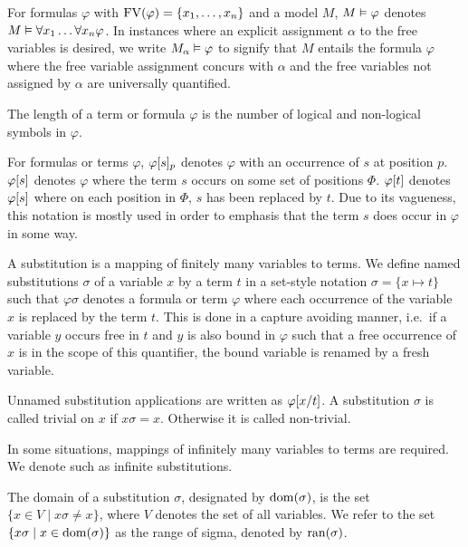 For formulas $\varphi$ with $\operatorname{FV}(\varphi) = \{x_1, \dots, x_n\}$ and a model $M$, $M\vDash \varphi$ denotes $M \vDash \forall x_1 \dots \forall x_n \varphi$.
In instances where an explicit assignment $\alpha$ to the free variables is desired,
we write $M_\alpha \vDash \varphi$ 
to signify that $M$ entails the formula $\varphi$ where the free variable assignment concurs with $\alpha$ and the free variables not assigned by $\alpha$ are universally quantified.

The length of a term or formula $\varphi$ is the number of logical and non-logical symbols in $\varphi$.

For formulas or terms $\varphi$, $\varphi{\ensuremath{[s]}_{p}}$ denotes $\varphi$ with an occurrence of $s$ at position $p$.
$\varphi[s]$ denotes $\varphi$ where the term $s$ occurs on some set of positions $\Phi$. $\varphi[t]$ denotes $\varphi[s]$ where on each position in $\Phi$, $s$ has been replaced by $t$. Due to its vagueness, this notation is mostly used in order to emphasis that the term $s$ does occur in $\varphi$ in some way.





A substitution is a mapping of finitely many variables to terms.
We define named substitutions $\sigma$ of a variable $x$ by a term $t$ in a set-style notation $\sigma = \{ x \mapsto t\}$ such that 
$\varphi\sigma$ denotes a formula or term $\varphi$ where each occurrence of the variable $x$ is replaced by the term $t$.
This is done in a capture avoiding manner, i.e.\ if a variable $y$ occurs free in $t$ and $y$ is also bound in $\varphi$ such that a free occurrence of $x$ is in the scope of this quantifier, the bound variable is renamed by a fresh variable.

Unnamed substitution applications are written as $\varphi[x/t]$.
A substitution $\sigma$ is called trivial on $x$ if $x\sigma = x$. Otherwise it is called non-trivial.

In some situations, mappings of infinitely many variables to terms are required. We denote such as infinite substitutions.

The domain of a substitution $\sigma$, designated by $\operatorname{dom}(\sigma)$, is the set $\{x \in V \mid x\sigma \neq x\}$, where $V$ denotes the set of all variables.
We refer to the set $\{x\sigma \mid x\in \operatorname{dom}(\sigma)\}$ as the range of sigma, denoted by $\operatorname{ran}(\sigma)$. 




